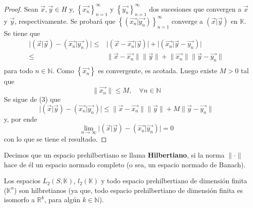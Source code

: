 \documentclass[12pt]{report}
\theoremstyle{largebreak}
\newcommand\abs[1]{\ensuremath{\big|#1\big|}}
\newcommand\norm[1]{\ensuremath{\|#1\|}}
\newcommand\pint[2]{\ensuremath{\left(#1\big| #2\right)}}
\begin{document}
    \begin{proof}
        Sean $\vec{x},\vec{y}\in H$ y, $\left\{\vec{x_n} \right\}_{n=1}^\infty$ y $\left\{\vec{y_n} \right\}_{n=1}^\infty$ dos sucesiones que convergen a $\vec{x}$ y $\vec{y}$, respectivamente. Se probará que $\left\{\pint{\vec{x_n}}{\vec{y_n}} \right\}_{n=1}^\infty$ converge a $\pint{\vec{x}}{\vec{y}}$ en $\mathbb{K}$.
        Se tiene que
        \begin{equation}
            \begin{split}
                \abs{\pint{\vec{x}}{\vec{y}}-\pint{\vec{x_n}}{\vec{y_n}}}
                \leq&\abs{\pint{\vec{x}-\vec{x_n}}{\vec{y}}}+\abs{\pint{\vec{x_n}}{\vec{y}-\vec{y_n}}}\\
                \leq&\norm{\vec{x}-\vec{x_n}}\norm{\vec{y}}+\norm{\vec{x_n}}\norm{\vec{y}-\vec{y_n}}\\
            \end{split}
        \end{equation}
        para todo $n\in\mathbb{N}$. Como $\left\{\vec{x_n} \right\}$ es convergente, es acotada. Luego existe $M>0$ tal que
        \begin{equation*}
            \norm{\vec{x_n}}\leq M,\quad\forall n\in\mathbb{N}
        \end{equation*}
        Se sigue de (3) que
        \begin{equation*}
            \abs{\pint{\vec{x}}{\vec{y}}-\pint{\vec{x_n}}{\vec{y_n}}}
            \leq\norm{\vec{x}-\vec{x_n}}\norm{\vec{y}}+M\norm{\vec{y}-\vec{y_n}}
        \end{equation*}
        y, por ende
        \begin{equation*}
            \lim_{n\rightarrow\infty}\abs{\pint{\vec{x}}{\vec{y}}-\pint{\vec{x_n}}{\vec{y_n}}}=0
        \end{equation*}
        con lo que se tiene el resultado.
    \end{proof}

    \begin{mydef}
        Decimos que un espacio prehilbertiano se llama \textbf{Hilbertiano}, si la norma $\norm{\cdot}$ hace de él un espacio normado completo (o sea, un espacio normado de Banach).
    \end{mydef}

    \begin{exa}
        Los espacios $L_2(S,\mathbb{K})$, $l_2(\mathbb{K})$ y todo espacio prehilbertiano de dimensión finita ($\mathbb{K}^n$) son hilbretianos (ya que, todo espacio prehilbertiano de dimensión finita es isomorfo a $\mathbb{R}^k$, para algún $k\in\mathbb{N}$).
    \end{exa}
\end{document}
